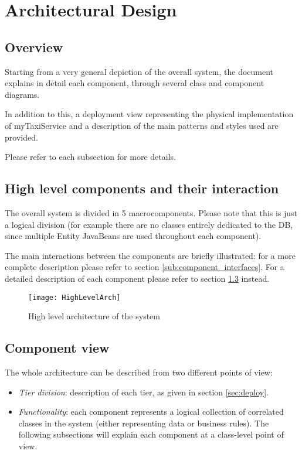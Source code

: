 \pagebreak
\section{Architectural Design}
 
\subsection{Overview}
Starting from a very general depiction of the overall system, the document 
explains in detail each component, through several class and component diagrams.

In addition to this, a deployment view representing the physical implementation 
of myTaxiService and a description of the main patterns and styles used are provided. 

Please refer to each subsection for more details.

\subsection{High level components and their interaction}
The overall system is divided in 5 macrocomponents. 
Please note that this is just a logical division (for example there are no 
classes entirely dedicated to the DB, since multiple Entity JavaBeans are used 
throughout each component). 

The main interactions between the components are briefly illustrated: for a 
more complete description please refer to section \ref{sub:component_interfaces}. 
For a detailed description of each component please refer to section \ref{sub:component_view} instead.

\begin{figure}[H]
    \centering
    \texttt{[image: HighLevelArch]}
    \caption{High level architecture of the system}
    \label{fig:hlarch}
\end{figure}

\pagebreak
\subsection{Component view}
\label{sub:component_view}

The whole architecture can be described from two different points of view: 
\begin{itemize}
	\item \emph{Tier division}: description of each tier, as given in section \ref{sec:deploy}.
	\item \emph{Functionality}: each component represents a logical collection of correlated classes in the system (either representing data or business rules). The following subsections will explain each component at a class-level point of view.
\end{itemize}

